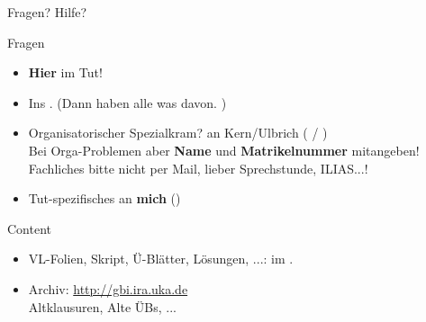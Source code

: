 \begin{frame}{Fragen? Hilfe?}	
	\begin{block}{Fragen}
		\begin{itemize}
			\item \textbf{Hier} im Tut!
			\item Ins \ILIAS. (Dann haben alle was davon. \smiley) \\
			\pause
			\item Organisatorischer Spezialkram? \impl an Kern/Ulbrich ( / ) \\
			Bei Orga-Problemen aber \textbf{Name} und \textbf{Matrikelnummer}  mitangeben! \\
			Fachliches bitte nicht per Mail, lieber \impl Sprechstunde, ILIAS...!
			\item Tut-spezifisches an \textbf{mich} (\mailto{\mymail})
		\end{itemize}
	\end{block}
	\pause
	\begin{block}{Content}
		\begin{itemize}
			\item VL-Folien, Skript, Ü-Blätter, Lösungen, ...: im \ILIAS.
			\item Archiv: \url{http://gbi.ira.uka.de} \\
			Altklausuren, Alte ÜBs, ...
		\end{itemize}
	\end{block}
\end{frame}




